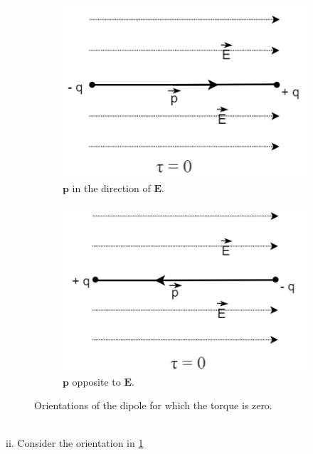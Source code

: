 \begin{figure}[h]
    \centering
    \begin{subfigure}[b]{0.45\textwidth}
    \centering
    \includegraphics[scale = 0.6]{figures/elecmag/dipoles1.png}
     \caption{$\bm{p}$ in the direction of $\bm{E}$.}
     \label{dp1}
    \end{subfigure}
    \hfill
     \begin{subfigure}[b]{0.45\textwidth}
     \centering
    \includegraphics[scale = 0.6]{figures/elecmag/dipoles2.png}
     \caption{$\bm{p}$ opposite to $\bm{E}$.}
     \label{dp2}
    \end{subfigure}
    
    \caption{Orientations of the dipole for which the torque is zero.}
    \label{dipoles}
\end{figure}
\\ii. Consider the orientation in \ref{dp1}
